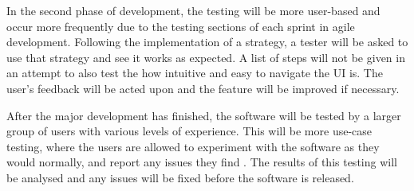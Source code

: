 In the second phase of development, the testing will be more user-based and occur more frequently due to the testing sections of each sprint in agile development. Following the implementation of a strategy, a tester will be asked to use that strategy and see it works as expected. A list of steps will not be given in an attempt to also test the how intuitive and easy to navigate the UI is. The user's feedback will be acted upon and the feature will be improved if necessary.

After the major development has finished, the software will be tested by a larger group of users with various levels of experience. This will be more use-case testing, where the users are allowed to experiment with the software as they would normally, and report any issues they find \cite{UseCaseTesting}. The results of this testing will be analysed and any issues will be fixed before the software is released.